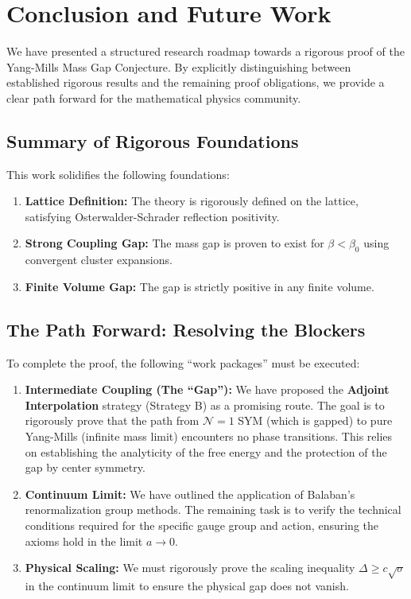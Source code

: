 \section{Conclusion and Future Work}
\label{sec:conclusion}

We have presented a structured research roadmap towards a rigorous proof of the Yang-Mills Mass Gap Conjecture. By explicitly distinguishing between established rigorous results and the remaining proof obligations, we provide a clear path forward for the mathematical physics community.

\subsection{Summary of Rigorous Foundations}

This work solidifies the following foundations:
\begin{enumerate}
    \item \textbf{Lattice Definition:} The theory is rigorously defined on the lattice, satisfying Osterwalder-Schrader reflection positivity.
    \item \textbf{Strong Coupling Gap:} The mass gap is proven to exist for $\beta < \beta_0$ using convergent cluster expansions.
    \item \textbf{Finite Volume Gap:} The gap is strictly positive in any finite volume.
\end{enumerate}

\subsection{The Path Forward: Resolving the Blockers}

To complete the proof, the following ``work packages'' must be executed:

\begin{enumerate}
    \item \textbf{Intermediate Coupling (The ``Gap''):} We have proposed the \textbf{Adjoint Interpolation} strategy (Strategy B) as a promising route. The goal is to rigorously prove that the path from $\mathcal{N}=1$ SYM (which is gapped) to pure Yang-Mills (infinite mass limit) encounters no phase transitions. This relies on establishing the analyticity of the free energy and the protection of the gap by center symmetry.
    
    \item \textbf{Continuum Limit:} We have outlined the application of Balaban's renormalization group methods. The remaining task is to verify the technical conditions required for the specific gauge group and action, ensuring the axioms hold in the limit $a \to 0$.
    
    \item \textbf{Physical Scaling:} We must rigorously prove the scaling inequality $\Delta \ge c \sqrt{\sigma}$ in the continuum limit to ensure the physical gap does not vanish.
\end{enumerate}

